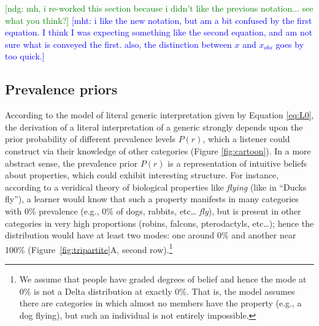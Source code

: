 \documentclass[floatsintext,doc]{apa6}
\let\rmarkdownfootnote\footnote%
\def\footnote{\protect\rmarkdownfootnote}
\newcommand{\mht}[1]{{\textcolor{Blue}{[mht: #1]}}}
\newcommand{\ndg}[1]{{\textcolor{Green}{[ndg: #1]}}}
\begin{document}
\ndg{mh, i re-worked this section because i didn't like the previous notation... see what you think?}
\mht{i like the new notation, but am a bit confused by the first equation. I think I was expecting something like the second equation, and am not sure what is conveyed the first. also, the distinction between $x$ and $x_{obs}$ goes by too quick.}
\subsection{Prevalence priors}

According to the model of literal generic interpretation given by Equation \ref{eq:L0}, the derivation of a literal interpretation of a generic strongly depends upon the prior probability of different prevalence levels \(P(r)\), which a listener could construct via their knowledge of other categories (Figure \ref{fig:cartoon}). 
In a more abstract sense, the prevalence prior \(P(r)\) is a representation of intuitive beliefs about properties, which could exhibit interesting structure.
For instance, according to a veridical theory of biological properties like \emph{flying} (like in ``Ducks fly''), a learner would know that such a property manifests in many categories with 0\% prevalence (e.g., 0\% of dogs, rabbits, etc\ldots{} \emph{fly}), but is present in other categories in very high proportions (robins, falcons, pterodactyls, etc\ldots{}); hence the distribution would have at least two modes: one around 0\% and another near 100\% (Figure~\ref{fig:tripartite}A, second row).\footnote{
	We assume that people have graded degrees of belief and hence the mode at 0\% is not a Delta distribution at exactly 0\%. That is, the model assumes there are categories in which almost no members have the property (e.g., a dog flying), but such an individual is not entirely impossible.}
\end{document}
